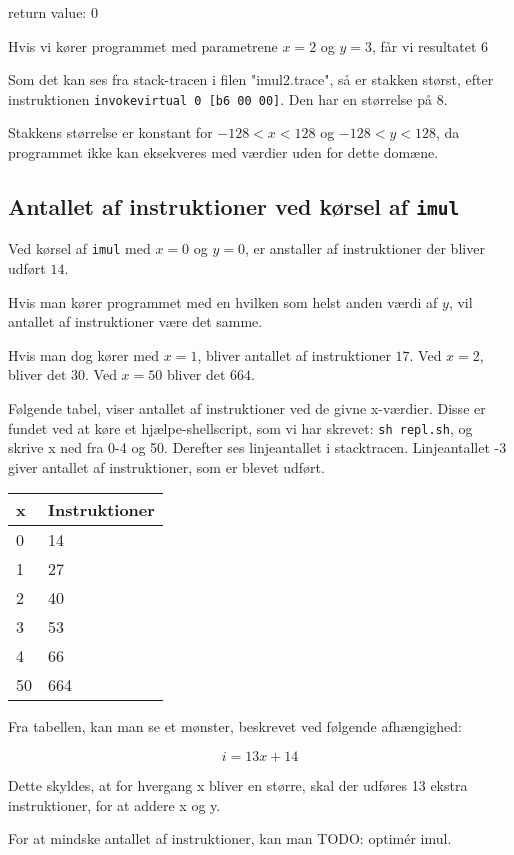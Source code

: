 \documentclass[12pt,a4paper]{article}
\newcommand{\imul}{\texttt{imul}}
\begin{document}
return value: $0$


Hvis vi kører programmet med parametrene $x=2$ og $y=3$, får vi resultatet $6$

Som det kan ses fra stack-tracen i filen "imul2.trace", så er stakken størst, efter instruktionen \texttt{invokevirtual 0 [b6 00 00]}. Den har en størrelse på $8$.

Stakkens størrelse er konstant for $-128 < x < 128$ og $-128 < y < 128$, da programmet ikke kan eksekveres med værdier uden for dette domæne.

\subsection{Antallet af instruktioner ved kørsel af \imul{}}
Ved kørsel af \imul{} med $x=0$ og $y=0$, er anstaller af instruktioner der bliver udført $14$.

Hvis man kører programmet med en hvilken som helst anden værdi af $y$, vil antallet af instruktioner være det samme.

Hvis man dog kører med $x=1$, bliver antallet af instruktioner $17$. Ved $x=2$, bliver det $30$. Ved $x=50$ bliver det $664$.

Følgende tabel, viser antallet af instruktioner ved de givne x-værdier. Disse er fundet ved at køre et hjælpe-shellscript, som vi har skrevet: \texttt{sh repl.sh}, og skrive x ned fra 0-4 og 50. Derefter ses linjeantallet i stacktracen. Linjeantallet -3 giver antallet af instruktioner, som er blevet udført.

\begin{tabular}{|l|l|}
\hline
x  & Instruktioner \\ \hline
0  & 14  \\ \hline
1  & 27  \\ \hline
2  & 40  \\ \hline
3  & 53  \\ \hline
4  & 66  \\ \hline
50 & 664 \\ \hline

\end{tabular}

Fra tabellen, kan man se et mønster, beskrevet ved følgende afhængighed:

\[
	i = 13x + 14
\]

Dette skyldes, at for hvergang x bliver en større, skal der udføres 13 ekstra instruktioner, for at addere x og y.

For at mindske antallet af instruktioner, kan man TODO: optimér imul.
\end{document}
